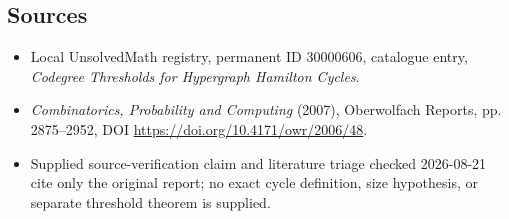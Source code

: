 \documentclass[11pt]{article}
\begin{document}
\subsection{Sources}
\begin{itemize}
\item Local UnsolvedMath registry, permanent ID 30000606, catalogue entry, \emph{Codegree Thresholds for Hypergraph Hamilton Cycles}.
\item \emph{Combinatorics, Probability and Computing} (2007), Oberwolfach Reports, pp. 2875--2952, DOI \url{https://doi.org/10.4171/owr/2006/48}.
\item Supplied source-verification claim and literature triage checked 2026-08-21 cite only the original report; no exact cycle definition, size hypothesis, or separate threshold theorem is supplied.
\end{itemize}
\end{document}
